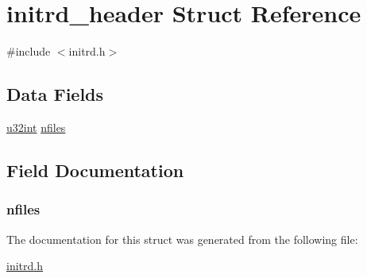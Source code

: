 \hypertarget{structinitrd__header}{
\section{initrd\_\-header Struct Reference}
\label{structinitrd__header}
}


{\ttfamily \#include $<$initrd.h$>$}

\subsection*{Data Fields}
\begin{DoxyCompactItemize}
\item 
\hyperlink{library_8h_ad7ecf93b77285d9bf039d27fa3f1a588}{u32int} \hyperlink{structinitrd__header_a56ba3190366248af937cdd79cc6efa6e}{nfiles}
\end{DoxyCompactItemize}


\subsection{Field Documentation}
\hypertarget{structinitrd__header_a56ba3190366248af937cdd79cc6efa6e}{
\subsubsection[{nfiles}]{ {\bf nfiles}}}
\label{structinitrd__header_a56ba3190366248af937cdd79cc6efa6e}


The documentation for this struct was generated from the following file:\begin{DoxyCompactItemize}
\item 
\hyperlink{initrd_8h}{initrd.h}\end{DoxyCompactItemize}
